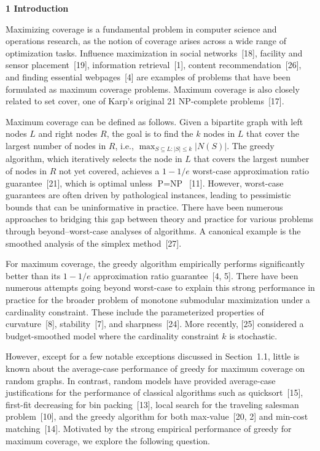 

\par\medskip\noindent\textbf{1 Introduction}\par




Maximizing coverage is a fundamental problem in computer science and operations research, as the notion of coverage arises across a wide range of optimization tasks. Influence maximization in social networks [18], facility and sensor placement [19], information retrieval [1], content recommendation [26], and finding essential webpages [4] are examples of problems that have been formulated as maximum coverage problems. Maximum coverage is also closely related to set cover, one of Karp’s original 21 NP-complete problems [17].\par




Maximum coverage can be defined as follows. Given a bipartite graph with left nodes $L$ and right nodes $R$, the goal is to find the $k$ nodes in $L$ that cover the largest number of nodes in $R$, i.e., $\max_{S\subseteq L:|S|\leq k}|N(S)|$.
The greedy algorithm, which iteratively selects the node in $L$ that covers the largest number of nodes in $R$ not yet covered, achieves a $1-1/e$ worst-case approximation ratio guarantee [21], which is optimal unless $\text{P}=\text{NP}$ [11]. However, worst-case guarantees are often driven by pathological instances, leading to pessimistic bounds that can be uninformative in practice. There have been numerous approaches to bridging this gap between theory and practice for various problems through beyond–worst-case analyses of algorithms. A canonical example is the smoothed analysis of the simplex method [27].\par




For maximum coverage, the greedy algorithm empirically performs significantly better than its $1-1/e$
approximation ratio guarantee [4, 5]. There have been numerous attempts going beyond worst-case to explain this strong performance in practice for the broader problem of monotone submodular maximization under a cardinality constraint. These include the parameterized properties of curvature [8], stability [7], and sharpness [24]. More recently, [25] considered a budget-smoothed model where the cardinality constraint $k$ is stochastic.\par




However, except for a few notable exceptions discussed in Section 1.1, little is known about the average-case performance of greedy for maximum coverage on random graphs. In contrast, random models have provided average-case justifications for the performance of classical algorithms such as quicksort [15], first-fit decreasing for bin packing [13], local search for the traveling salesman problem [10], and the greedy algorithm for both max-value [20, 2] and min-cost matching [14]. Motivated by the strong empirical performance of greedy for maximum coverage, we explore the following question.\par




